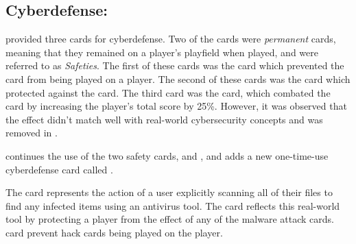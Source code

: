 \subsection{Cyberdefense:}
\pwOne provided three cards for cyberdefense. Two of the cards were \emph{permanent} cards, meaning that they remained on a player's playfield when played, and were referred to as \emph{Safeties}. The first of these cards was the \Anti card which prevented the \Mal card from being played on a player. The second of these cards was the \Fire card which protected against the \Hack card. The third card was the \Over card, which combated the \Mal card by increasing the player's total score by 25\%. However, it was observed that the \Over effect didn't match well with real-world cybersecurity concepts and was removed in \pwThree.  

\pwThree continues the use of the two safety cards, \Anti and \Firens, and adds a new one-time-use cyberdefense card called \Scanns. 

The \Scan card represents the action of a user explicitly scanning all of their files to find any infected items using an antivirus tool. The \Anti card reflects this real-world tool by protecting a player from the effect of any of the malware attack cards. \Fire card prevent hack cards being played on the player.

